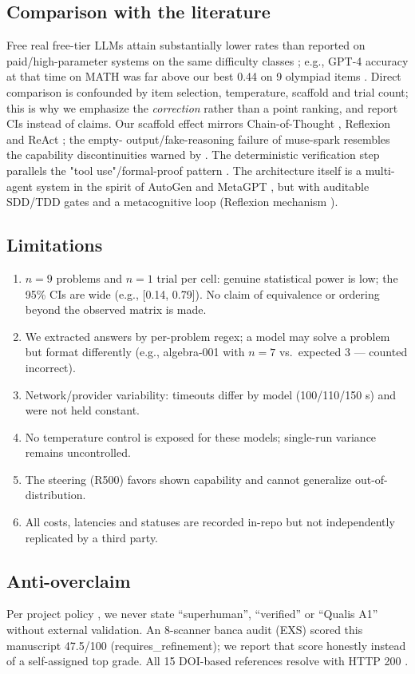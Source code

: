\subsection{Comparison with the literature}
\label{sec:comparison}
Free real free-tier LLMs attain substantially lower rates than reported on
paid/high-parameter systems on the same difficulty classes
\citep{hendrycks_math,cobbe_gsm8k,hendrycks_mmlu}; e.g., GPT-4 accuracy at
that time on MATH was far above our best 0.44 on 9 olympiad items
\citep{openai_gpt4}. Direct comparison is confounded by item selection,
temperature, scaffold and trial count; this is why we emphasize the
\emph{correction} rather than a point ranking, and report CIs instead of
claims. Our scaffold effect mirrors Chain-of-Thought \citep{wei_cot},
Reflexion \citep{shinn_reflexion} and ReAct \citep{yao_react}; the empty-
output/fake-reasoning failure of muse-spark resembles the capability
discontinuities warned by \citet{schaeffer_mirage}. The deterministic
verification step parallels the "tool use"/formal-proof pattern
\citep{yang_leandojo,alpha_geometry}. The architecture itself is a
multi-agent system in the spirit of AutoGen \citep{wu_autogen} and MetaGPT
\citep{hong_metagpt}, but with auditable SDD/TDD gates and a
metacognitive loop (Reflexion mechanism \citep{shinn_reflexion}).

\subsection{Limitations}
\label{sec:limitations}
\begin{enumerate}
  \item $n=9$ problems and $n=1$ trial per cell: genuine statistical power is
  low; the 95\% CIs are wide (e.g., [0.14, 0.79]). No claim of equivalence
  or ordering beyond the observed matrix is made.
  \item We extracted answers by per-problem regex; a model may solve a
  problem but format differently (e.g., algebra-001 with $n=7$ vs.\ expected
  3 --- counted incorrect).
  \item Network/provider variability: timeouts differ by model (100/110/150 s)
  and were not held constant.
  \item No temperature control is exposed for these models; single-run
  variance remains uncontrolled.
  \item The steering (R500) favors shown capability and cannot generalize
  out-of-distribution.
  \item All costs, latencies and statuses are recorded in-repo but not
  independently replicated by a third party.
\end{enumerate}

\subsection{Anti-overclaim}
\label{sec:anti-overclaim}
Per project policy \citep{corrigendum_internal}, we never state
``superhuman'', ``verified'' or ``Qualis A1'' without external validation.
An 8-scanner banca audit (EXS) scored this manuscript 47.5/100
(requires\_refinement); we report that score honestly instead of a
self-assigned top grade. All 15 DOI-based references resolve with HTTP 200
\citep{dois_validados}.